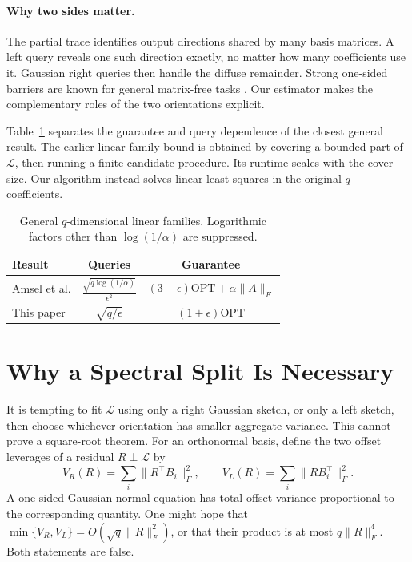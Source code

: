 \documentclass[twoside]{article}
\newcommand{\cL}{\mathcal L}
\newcommand{\OPT}{\mathrm{OPT}}
\begin{document}
\paragraph{Why two sides matter.}
The partial trace identifies output directions shared by many basis matrices. A left query reveals one such direction exactly, no matter how many coefficients use it. Gaussian right queries then handle the diffuse remainder. Strong one-sided barriers are known for general matrix-free tasks \citep{halikias2026transpose}. Our estimator makes the complementary roles of the two orientations explicit.

Table~\ref{tab:comparison} separates the guarantee and query dependence of the closest general result. The earlier linear-family bound is obtained by covering a bounded part of $\cL$, then running a finite-candidate procedure. Its runtime scales with the cover size. Our algorithm instead solves linear least squares in the original $q$ coefficients.

\begin{table}[t]
\centering
\caption{General $q$-dimensional linear families. Logarithmic factors other
than $\log(1/\alpha)$ are suppressed.}
\label{tab:comparison}
\small
\begin{tabular}{lcc}
\toprule
Result & Queries & Guarantee \\
\midrule
Amsel et al. &
$\frac{\sqrt{q\log(1/\alpha)}}{\epsilon^2}$ &
$(3+\epsilon)\OPT+\alpha\|A\|_F$ \\
This paper & $\sqrt{q/\epsilon}$ & $(1+\epsilon)\OPT$ \\
\bottomrule
\end{tabular}
\end{table}

\section{Why a Spectral Split Is Necessary}
\label{sec:obstruction}

It is tempting to fit $\cL$ using only a right Gaussian sketch, or only a left sketch, then choose whichever orientation has smaller aggregate variance. This cannot prove a square-root theorem. For an orthonormal basis, define the two offset leverages of a residual $R\perp\cL$ by
\begin{equation}
 V_R(R)=\sum_i\|R^\top B_i\|_F^2,
 \qquad
 V_L(R)=\sum_i\|RB_i^\top\|_F^2.
 \label{eq:offset-leverages}
\end{equation}
A one-sided Gaussian normal equation has total offset variance proportional to the corresponding quantity. One might hope that $\min\{V_R,V_L\}=O(\sqrt q\|R\|_F^2)$, or that their product is at most $q\|R\|_F^4$. Both statements are false.
\end{document}
